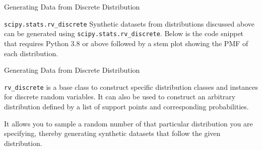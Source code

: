 \documentclass[aspectratio=169,xcolor=dvipsnames,svgnames,x11names,fleqn]{beamer}
\begin{document}
    
    \begin{frame}[containsverbatim]{Generating Data from Discrete Distribution}
    
    \begin{gradblock}{\texttt{scipy.stats.rv\_discrete}}
        Synthetic datasets from distributions discussed above can be generated using \texttt{scipy.stats.rv\_discrete}. Below is the code snippet that requires Python 3.8 or above followed by a stem plot showing the PMF of each distribution.
    \end{gradblock}
\end{frame}
    

\begin{frame}[containsverbatim]{Generating Data from Discrete Distribution}

    \begin{facts}
        \texttt{rv\_discrete} is a base class to construct specific distribution classes and instances for discrete random variables. It can also be used to construct an arbitrary distribution defined by a list of support points and corresponding probabilities.
    
    It allows you to sample a random number of that particular distribution you are specifying, thereby generating synthetic datasets that follow the given distribution.
    \end{facts}
    
\end{frame}
    

    
\end{document}
